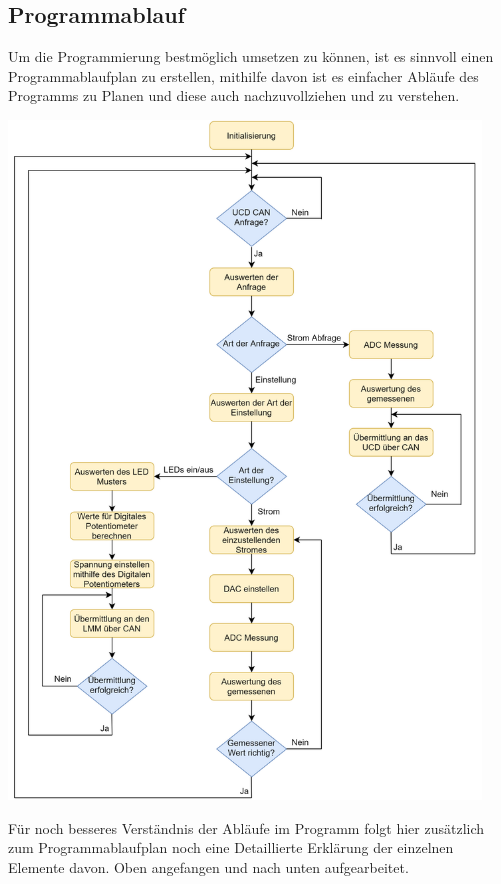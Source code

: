 \documentclass[paper=a4, 12pt]{scrreprt}
\begin{document}
		\subsection{Programmablauf}\hfill \break
		Um die Programmierung bestmöglich umsetzen zu können, ist es sinnvoll einen Programmablaufplan zu erstellen, mithilfe davon ist es einfacher Abläufe des Programms zu Planen und diese auch nachzuvollziehen und zu verstehen.
		\begin{adjustbox}{center,caption={Programmablaufplan},label={fig:PAP.png},nofloat=figure,vspace=\bigskipamount}
			\includegraphics[height=18cm]{img/Dyn-LED-Driver-PAP.png}
		\end{adjustbox}
		Für noch besseres Verständnis der Abläufe im Programm folgt hier zusätzlich zum Programmablaufplan noch eine Detaillierte Erklärung der einzelnen Elemente davon. Oben angefangen und nach unten aufgearbeitet.
\end{document}
